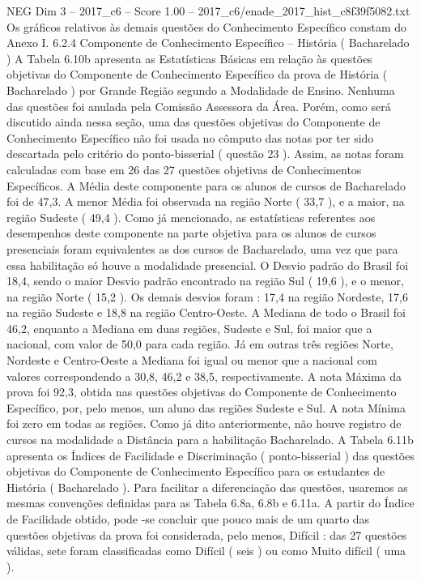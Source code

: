 \begin{textsample}{NEG Dim 3 – 2017\_c6 – Score 1.00 – 2017\_c6/enade\_2017\_hist\_c8f39f5082.txt}
Os gráficos relativos às demais questões do Conhecimento Específico constam do Anexo I. 6.2.4 Componente de Conhecimento Específico – História ( Bacharelado ) A Tabela 6.10b apresenta as Estatísticas Básicas em relação às questões objetivas do Componente de Conhecimento Específico da prova de História ( Bacharelado ) por Grande Região segundo a Modalidade de Ensino.
Nenhuma das questões foi anulada pela Comissão Assessora da Área.
Porém, como será discutido ainda nessa seção, uma das questões objetivas do Componente de Conhecimento Específico não foi usada no cômputo das notas por ter sido descartada pelo critério do ponto-bisserial ( questão 23 ).
Assim, as notas foram calculadas com base em 26 das 27 questões objetivas de Conhecimentos Específicos.
A Média deste componente para os alunos de cursos de Bacharelado foi de 47,3.
A menor Média foi observada na região Norte ( 33,7 ), e a maior, na região Sudeste ( 49,4 ).
Como já mencionado, as estatísticas referentes aos desempenhos deste componente na parte objetiva para os alunos de cursos presenciais foram equivalentes as dos cursos de Bacharelado, uma vez que para essa habilitação só houve a modalidade presencial.
O Desvio padrão do Brasil foi 18,4, sendo o maior Desvio padrão encontrado na região Sul ( 19,6 ), e o menor, na região Norte ( 15,2 ).
Os demais desvios foram : 17,4 na região Nordeste, 17,6 na região Sudeste e 18,8 na região Centro-Oeste.
A Mediana de todo o Brasil foi 46,2, enquanto a Mediana em duas regiões, Sudeste e Sul, foi maior que a nacional, com valor de 50,0 para cada região.
Já em outras três regiões Norte, Nordeste e Centro-Oeste a Mediana foi igual ou menor que a nacional com valores correspondendo a 30,8, 46,2 e 38,5, respectivamente.
A nota Máxima da prova foi 92,3, obtida nas questões objetivas do Componente de Conhecimento Específico, por, pelo menos, um aluno das regiões Sudeste e Sul.
A nota Mínima foi zero em todas as regiões.
Como já dito anteriormente, não houve registro de cursos na modalidade a Distância para a habilitação Bacharelado.
A Tabela 6.11b apresenta os Índices de Facilidade e Discriminação ( ponto-bisserial ) das questões objetivas do Componente de Conhecimento Específico para os estudantes de História ( Bacharelado ).
Para facilitar a diferenciação das questões, usaremos as mesmas convenções definidas para as Tabela 6.8a, 6.8b e 6.11a.
A partir do Índice de Facilidade obtido, pode -se concluir que pouco mais de um quarto das questões objetivas da prova foi considerada, pelo menos, Difícil : das 27 questões válidas, sete foram classificadas como Difícil ( seis ) ou como Muito difícil ( uma ).

\end{textsample}
